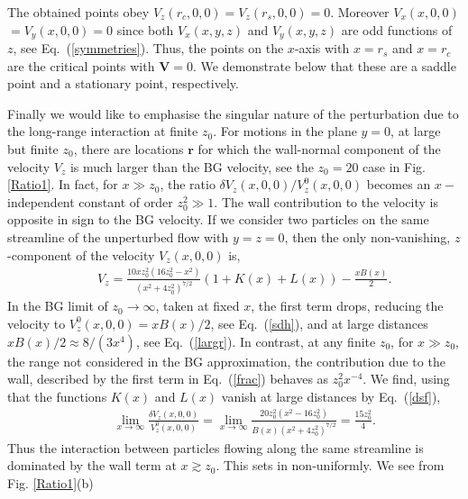 The obtained points obey $V_z(r_c, 0, 0)=V_z(r_s, 0, 0)=0$. Moreover $ V_x(x, 0, 0)$ $=V_y(x, 0, 0)=0$ since both $V_x(x, y, z)$ and $V_y(x, y, z)$ are odd functions of $z$, see Eq.~(\ref{symmetries}). Thus, the points on the $x$-axis with $x=r_s$ and $x=r_c$ are the critical points with $\bm V=0$. We demonstrate below that these are a saddle point and a stationary point, respectively.

Finally we would like to emphasise the singular nature of the perturbation due to the long-range interaction at finite $z_0$. For motions in the plane $y=0$, at large but finite $z_0$, there are locations $\bm r$ for which the wall-normal component of the velocity $V_z$ is much larger than the BG velocity, see the $z_0=20$ case in Fig. \ref{Ratio1}. In fact, for $x\gg z_0$, the ratio $\delta V_z(x, 0, 0)/V^0_z(x, 0, 0)$ becomes an $x-$independent constant of order $z_0^2\gg 1$. The wall contribution to the velocity is opposite in sign to the BG velocity. If we consider two particles on the same streamline of the unperturbed flow with $y=z=0$, then the only non-vanishing, $z$-component of
the velocity $V_z(x, 0, 0)$ is,
\begin{eqnarray}&&\!\!\!\!\!\!\!\!\!\!\!\!\!\!\!\!
V_z\!=\!\frac{10x z_0^2(16z_0^2\!-\!x^2)}{(x^2\!+\!4z_0^2)^{7/2}}(1\!+\!K(x)\!+\!L(x))\!-\!\frac{xB(x)}{2}. \label{frac}
\end{eqnarray}
In the BG limit of $z_0\to \infty$, taken at fixed $x$, the first term drops, reducing the velocity to $V_z^0(x, 0, 0)=xB(x)/2$, see Eq.~(\ref{sdh}), and at large distances  $xB(x)/2\approx 8/(3x^{4})$, see Eq.~(\ref{largr}). In contrast, at any finite $z_0$, for $x\gg z_0$, the range not considered in the BG approximation, the contribution due to the wall, described by the first term in Eq.~(\ref{frac}) behaves as $z_0^2 x^{-4}$. We find, using that the functions $K(x)$ and $L(x)$  vanish at large distances by Eq.~(\ref{dsf}),
\begin{eqnarray}&&\!\!\!\!\!\!\!\!\!\!\!\!
\lim_{x\to\infty}\frac{\delta V_z(x, 0, 0)}{V_z^0(x, 0, 0)}\!=\!\lim_{x\to\infty}\frac{20 z_0^2(x^2\!-\!16z_0^2)}{B(x)(x^2\!+\!4z_0^2)^{7/2}}
=\frac{15 z_0^2}{4}. \label{limit}
\end{eqnarray}
Thus the interaction between particles flowing along the same streamline is dominated by the wall term at $x\gtrsim z_0$. This sets in non-uniformly. We see
from Fig. \ref{Ratio1}(b)
